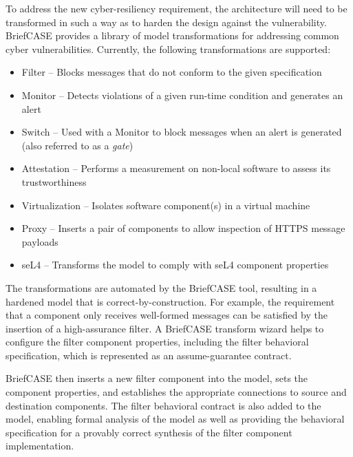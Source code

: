 To address the new cyber-resiliency requirement, the architecture will need to be transformed in such a way as to harden the design against the vulnerability.
BriefCASE provides a library of model transformations for addressing common cyber vulnerabilities.  Currently, the following transformations are supported:

\begin{itemize}
	\item Filter -- Blocks messages that do not conform to the given specification
	\item Monitor -- Detects violations of a given run-time condition and generates an alert
	\item Switch -- Used with a Monitor to block messages when an alert is generated (also referred to as a \textit{gate})
	\item Attestation -- Performs a measurement on non-local software to assess its trustworthiness
	\item Virtualization -- Isolates software component(s) in a virtual machine
	\item Proxy -- Inserts a pair of components to allow inspection of %
		HTTPS message payloads
	\item seL4 -- Transforms the model to comply with seL4 component properties
\end{itemize}  

The transformations are automated by the BriefCASE tool, resulting in a hardened model that is correct-by-construction.  
For example, the requirement that a component only receives well-formed messages can be satisfied by the insertion of a high-assurance filter.  
A BriefCASE transform wizard 
helps to configure the filter component properties, including the filter behavioral specification, which is represented as an assume-guarantee contract.


BriefCASE then inserts a new filter component into the model, sets the component properties, and establishes the appropriate connections to source and destination components. The filter behavioral contract is also added to the model, enabling formal analysis of the model as well as providing the behavioral specification for a provably correct synthesis of the filter component implementation.

